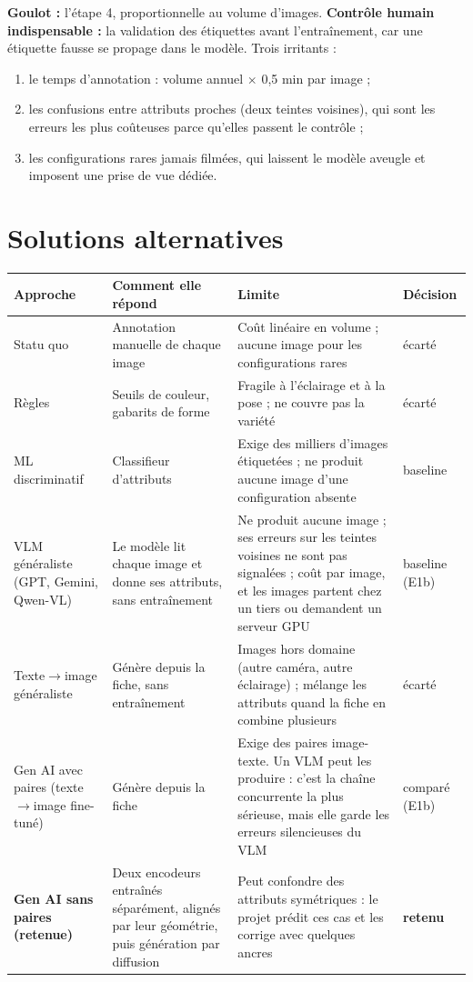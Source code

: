 \documentclass[10pt,a4paper]{article}
\begin{document}
\textbf{Goulot :} l'étape 4, proportionnelle au volume d'images. \textbf{Contrôle humain indispensable :} la validation des étiquettes avant l'entraînement, car une étiquette fausse se propage dans le modèle. Trois irritants :
\begin{enumerate}
\item le temps d'annotation : volume annuel $\times$ 0,5 min par image ;
\item les confusions entre attributs proches (deux teintes voisines), qui sont les erreurs les plus coûteuses parce qu'elles passent le contrôle ;
\item les configurations rares jamais filmées, qui laissent le modèle aveugle et imposent une prise de vue dédiée.
\end{enumerate}

\section{Solutions alternatives}

\begin{center}\small
\begin{tabularx}{\textwidth}{@{}P{2.9cm}LLP{1.6cm}@{}}
\toprule
Approche & Comment elle répond & Limite & Décision \\
\midrule
Statu quo & Annotation manuelle de chaque image & Coût linéaire en volume ; aucune image pour les configurations rares & écarté \\
Règles & Seuils de couleur, gabarits de forme & Fragile à l'éclairage et à la pose ; ne couvre pas la variété & écarté \\
ML discriminatif & Classifieur d'attributs & Exige des milliers d'images étiquetées ; ne produit aucune image d'une configuration absente & baseline \\
VLM généraliste (GPT, Gemini, Qwen-VL) & Le modèle lit chaque image et donne ses attributs, sans entraînement & Ne produit aucune image ; ses erreurs sur les teintes voisines ne sont pas signalées ; coût par image, et les images partent chez un tiers ou demandent un serveur GPU & baseline (E1b) \\
Texte$\to$image généraliste & Génère depuis la fiche, sans entraînement & Images hors domaine (autre caméra, autre éclairage) ; mélange les attributs quand la fiche en combine plusieurs & écarté \\
Gen AI avec paires (texte$\to$image fine-tuné) & Génère depuis la fiche & Exige des paires image-texte. Un VLM peut les produire : c'est la chaîne concurrente la plus sérieuse, mais elle garde les erreurs silencieuses du VLM & comparé (E1b) \\
\textbf{Gen AI sans paires (retenue)} & Deux encodeurs entraînés séparément, alignés par leur géométrie, puis génération par diffusion & Peut confondre des attributs symétriques : le projet prédit ces cas et les corrige avec quelques ancres & \textbf{retenu} \\
\bottomrule
\end{tabularx}
\end{center}
\end{document}

